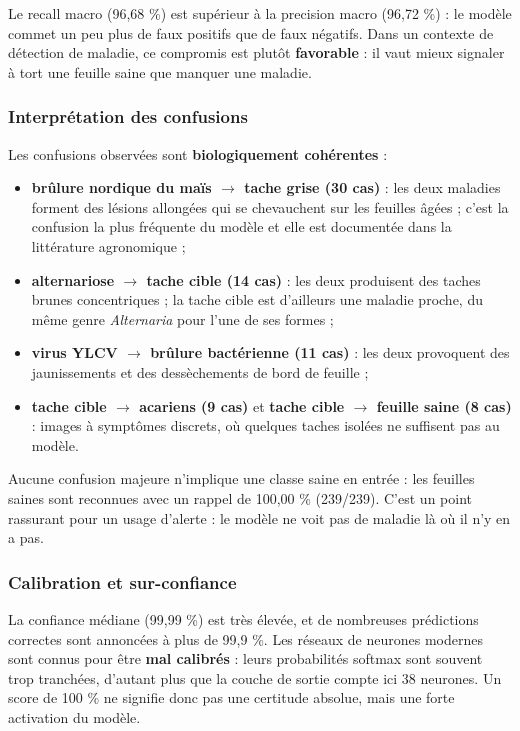 \documentclass[10pt,a4paper]{article}
\begin{document}
Le recall macro (96,68 \%) est supérieur à la precision macro (96,72 \%) : le modèle commet un peu plus de faux positifs que de faux négatifs. Dans un contexte de détection de maladie, ce compromis est plutôt \textbf{favorable} : il vaut mieux signaler à tort une feuille saine que manquer une maladie.

\subsubsection{Interprétation des confusions}

Les confusions observées sont \textbf{biologiquement cohérentes} :

\begin{itemize}
\item \textbf{brûlure nordique du maïs $\rightarrow$ tache grise (30 cas)} : les deux maladies forment des lésions allongées qui se chevauchent sur les feuilles âgées ; c'est la confusion la plus fréquente du modèle et elle est documentée dans la littérature agronomique ;
\item \textbf{alternariose $\rightarrow$ tache cible (14 cas)} : les deux produisent des taches brunes concentriques ; la tache cible est d'ailleurs une maladie proche, du même genre \emph{Alternaria} pour l'une de ses formes ;
\item \textbf{virus YLCV $\rightarrow$ brûlure bactérienne (11 cas)} : les deux provoquent des jaunissements et des dessèchements de bord de feuille ;
\item \textbf{tache cible $\rightarrow$ acariens (9 cas)} et \textbf{tache cible $\rightarrow$ feuille saine (8 cas)} : images à symptômes discrets, où quelques taches isolées ne suffisent pas au modèle.
\end{itemize}

Aucune confusion majeure n'implique une classe saine en entrée : les feuilles saines sont reconnues avec un rappel de 100,00 \% (239/239). C'est un point rassurant pour un usage d'alerte : le modèle ne \guillemotleft{} voit \guillemotright{} pas de maladie là où il n'y en a pas.

\subsubsection{Calibration et sur-confiance}

La confiance médiane (99,99 \%) est très élevée, et de nombreuses prédictions correctes sont annoncées à plus de 99,9 \%. Les réseaux de neurones modernes sont connus pour être \textbf{mal calibrés} : leurs probabilités softmax sont souvent trop tranchées, d'autant plus que la couche de sortie compte ici 38 neurones. Un score de 100 \% ne signifie donc pas une certitude absolue, mais une forte activation du modèle.
\end{document}
